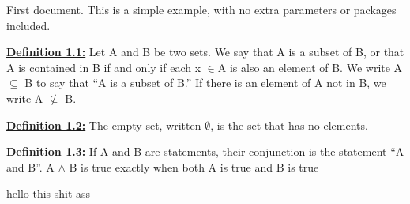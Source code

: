 \documentclass[10pt]{article}
\title{}
\begin{document}
First document. This is a simple example, with no 
extra parameters or packages included. 
\par

\fontsize{12}{10}
\textbf{\underline{Definition 1.1:}}
Let A and B be two sets. We say that A is a subset of B, or that A is contained
in B if and only if each x $ \in $A is also an element of B. We write  A $ \subseteq $ B to say that “A is a
subset of B.” If there is an element of A not in B, we write A $ \nsubseteq $ B.
\par

\fontsize{12}{10}
\textbf{\underline{Definition 1.2:}}
The empty set, written $ \emptyset $, is the set that has no elements.
\par

\fontsize{12}{10}
\textbf{\underline{Definition 1.3:}}
If A and B are statements, their conjunction is the statement “A and B”.
A $ \wedge $ B is true exactly when both A is true and B is true
\par
hello this shit ass
\end{document}
